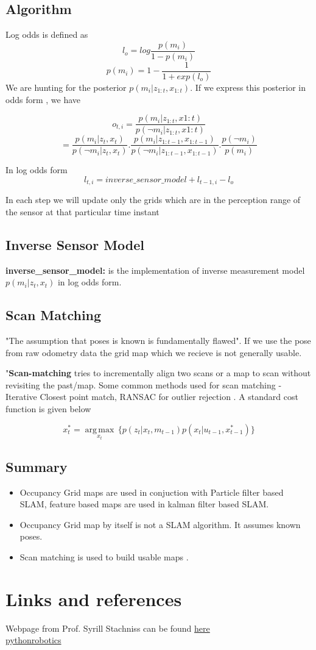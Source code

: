 \documentclass{article}
\begin{document}
\subsection{Algorithm}
Log odds is defined as $$l_o = log\frac{p(m_i)}{1 - p(m_i)}$$ 
$$ p(m_i) = 1 - \frac{1}{1+exp(l_o)}$$
We are hunting for the posterior $p(m_i|z_{1:t},x_{1:t})$. If we express this posterior in odds form , we have 

$$o_{t,i} = \frac{p(m_i|z_{1:t},x{1:t})}{p(\neg m_i | z_{1:t},x{1:t})}$$
$$= \frac{p(m_i|z_t,x_t)}{p(\neg m_i|z_t,x_t)} . \frac{p(m_i| z_{1:t-1},x_{1:t-1})}{p(\neg m_i| z_{1:t-1},x_{1:t-1})} . \frac{p(\neg m_i)}{p(m_i)}$$

In log odds form 
$$l_{t,i} = inverse\_sensor\_model + l_{t-1,i} - l_o$$

In each step we will update only the grids which are in the perception range of the sensor at that particular time instant 

\subsection{Inverse Sensor Model} 
\textbf{inverse\_sensor\_model:} is the implementation of inverse measurement model $p(m_i| z_t,x_t)$ in log odds form.

\subsection{Scan Matching}

"The assumption that poses is known is fundamentally flawed". If we use the pose from raw odometry data the grid map which we recieve is not generally usable. 

"\textbf{Scan-matching} tries to incrementally align two scans or a map to scan without revisiting the past/map. Some common methods used for scan matching - Iterative Closest point match, RANSAC for outlier rejection . A standard cost function is given below 

$${\displaystyle x_t^* = {\underset {x_t}{\operatorname {arg\,max} }}\,\{p(z_t|x_t,m_{t-1})p(x_t | u_{t-1},x_{t-1}^*)\}}$$

\subsection{Summary}
\begin{itemize}
    \item Occupancy Grid maps are used in conjuction with Particle filter based SLAM, feature based maps are used in kalman filter based SLAM.
    \item Occupancy Grid map by itself is not a SLAM algorithm. It assumes known poses. 
    \item Scan matching is used to build usable maps . 
\end{itemize}




\section{Links and references}
Webpage from  Prof. Syrill Stachniss can be found \href{http://ais.informatik.uni-freiburg.de/teaching/ws13/mapping/}{here}\\
\href{https://pythonrobotics.readthedocs.io}{pythonrobotics}
\end{document}
